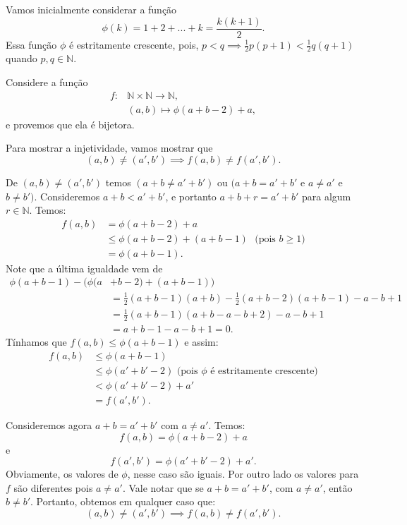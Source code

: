 \documentclass[../main.tex]{subfiles}
\begin{document}
\begin{dem}
    Vamos inicialmente considerar a função 
    \[\phi(k) = 1 + 2 + ... + k = \frac{k(k+1)}{2}.\]
    Essa função $\phi$ é estritamente crescente, pois, $p < q \implies \frac{1}{2} p (p+1) < \frac{1}{2} q (q+1)$ quando $p,q \in \mathbb{N}$.

    Considere a função 
    \begin{align*}
        f \colon &\mathbb{N} \times \mathbb{N} \to \mathbb{N}, \\
        &(a,b) \mapsto \phi(a+b-2) + a,
    \end{align*}
    e provemos que ela é bijetora.
    
    Para mostrar a injetividade, vamos mostrar que 
    \[ (a,b) \neq (a',b') \implies f(a,b) \neq f(a',b'). \]

    De $(a,b) \neq (a',b')$ temos $(a+b \neq a'+b')$ ou $(a+b = a'+b'$ e $a \neq a' $ e $ b \neq b')$.
    Consideremos $a+b < a'+b'$, e portanto $a+b+r = a'+b'$ para algum $r \in \mathbb{N}$. Temos:
    \begin{align*}
        f(a,b) 
        &= \phi(a+b-2) + a \\
        &\leq \phi(a+b-2) + (a+b-1) \hspace{4pt} \text{ (pois $b \geq 1$)} \\
        &=  \phi(a+b-1).
    \end{align*}
    Note que a última igualdade vem de
    \begin{align*}
        \phi(a+b-1) - \big(  \phi(a&+b-2) + (a+b-1) \big) \\
        &= \frac{1}{2}(a+b-1)(a+b) - \frac{1}{2}(a+b-2)(a+b-1) - a - b + 1 \\
        &= \frac{1}{2}(a+b-1)(a+b -a-b+2) - a - b + 1 \\
        &= a+b-1-a-b+1 = 0.   
    \end{align*}
    Tínhamos que $f(a,b) \leq \phi(a+b-1)$ e assim: 
    \begin{align*}
        f(a,b) &\leq \phi(a+b-1) \\
        &\leq \phi(a' + b' -2) \text{ (pois $\phi$ é estritamente crescente)} \\
        &< \phi(a'+b' - 2) + a' \\
        &= f(a',b').
    \end{align*}

    \noindent
    Consideremos agora $a+b = a'+b'$ com $a \neq a'$. Temos:
    \[ f(a,b) = \phi(a+b-2) + a \]
    e
    \[ f(a',b') = \phi(a'+b'-2) + a'. \]
    Obviamente, os valores de $\phi$, nesse caso são iguais. Por outro lado os valores para $f$ são diferentes pois $a \neq a'$.
    Vale notar que se $a+b = a'+b'$, com $a \neq a'$, então $b \neq b'$. 
    Portanto, obtemos em qualquer caso que:
    \[ (a,b) \neq (a',b') \implies f(a,b) \neq f(a',b'). \]


\end{dem}
\end{document}
